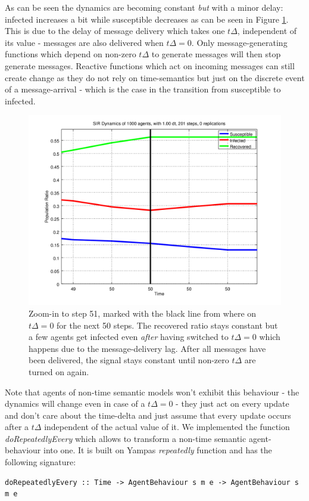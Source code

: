 As can be seen  the dynamics are becoming constant \textit{but} with a minor delay: infected increases a bit while susceptible decreases as can be seen in Figure \ref{fig:sir_abs_zero_dt_zoom}. This is due to the delay of message delivery which takes one $t\Delta$, independent of its value - messages are also delivered when $t\Delta = 0$. Only message-generating functions which depend on non-zero $t\Delta$ to generate messages will then stop generate messages. Reactive functions which act on incoming messages can still create change as they do not rely on time-semantics but just on the discrete event of a message-arrival - which is the case in the transition from susceptible to infected.

\begin{figure}
	\centering
	\includegraphics[width=.4\textwidth, angle=0]{./../shared/fig/dtzero/SIR_ABS_zeroDt_mid_zoom.png}
	\caption{Zoom-in to step 51, marked with the black line from where on $t\Delta = 0$ for the next 50 steps. The recovered ratio stays constant but a few agents get infected even \textit{after} having switched to $t\Delta = 0$ which happens due to the message-delivery lag. After all messages have been delivered, the signal stays constant until non-zero $t\Delta$ are turned on again.}
	\label{fig:sir_abs_zero_dt_zoom}
\end{figure}

Note that agents of non-time semantic models won't exhibit this behaviour - the dynamics will change even in case of a $t\Delta = 0$ - they just act on every update and don't care about the time-delta and just assume that every update occurs after a $t\Delta$ independent of the actual value of it. We implemented the function \textit{doRepeatedlyEvery} which allows to transform a non-time semantic agent-behaviour into one. It is built on Yampas \textit{repeatedly} function and has the following signature:

\begin{verbatim}
doRepeatedlyEvery :: Time -> AgentBehaviour s m e -> AgentBehaviour s m e
\end{verbatim}


